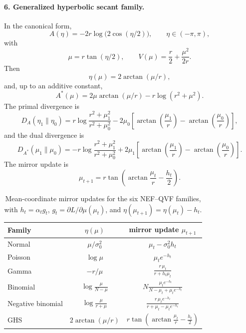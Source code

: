\documentclass[11pt]{article}
\begin{document}
\paragraph{6. Generalized hyperbolic secant family.}
In the canonical form,
\[
A(\eta)=-2r\log\!\bigl(2\cos(\eta/2)\bigr),
\qquad
\eta\in(-\pi,\pi),
\]
with
\[
\mu=r\tan(\eta/2),
\qquad
V(\mu)=\frac{r}{2}+\frac{\mu^2}{2r}.
\]
Then
\[
\eta(\mu)=2\arctan(\mu/r),
\]
and, up to an additive constant,
\[
A^\ast(\mu)=2\mu\arctan(\mu/r)-r\log(r^2+\mu^2).
\]
The primal divergence is
\[
D_A(\eta_1\|\eta_0)
=
r\log\frac{r^2+\mu_1^2}{r^2+\mu_0^2}
-
2\mu_0\left[
\arctan\!\left(\frac{\mu_1}{r}\right)
-
\arctan\!\left(\frac{\mu_0}{r}\right)
\right],
\]
and the dual divergence is
\[
D_{A^\ast}(\mu_1\|\mu_0)
=
-r\log\frac{r^2+\mu_1^2}{r^2+\mu_0^2}
+
2\mu_1\left[
\arctan\!\left(\frac{\mu_1}{r}\right)
-
\arctan\!\left(\frac{\mu_0}{r}\right)
\right].
\]
The mirror update is
\[
\mu_{t+1}
=
r\tan\!\left(
\arctan\!\frac{\mu_t}{r}
-\frac{h_t}{2}
\right).
\]

\begin{table}[t]
\centering
\begin{tabular}{lcc}
\toprule
Family & \(\eta(\mu)\) & mirror update \(\mu_{t+1}\) \\
\midrule
Normal & \(\mu/\sigma_0^2\) &
\(\mu_t-\sigma_0^2 h_t\) \\[2mm]

Poisson & \(\log\mu\) &
\(\mu_t e^{-h_t}\) \\[2mm]

Gamma & \(-r/\mu\) &
\(\displaystyle \frac{r\,\mu_t}{r+h_t\mu_t}\) \\[3mm]

Binomial & \(\log\frac{\mu}{N-\mu}\) &
\(\displaystyle N\frac{\mu_t e^{-h_t}}{N-\mu_t+\mu_t e^{-h_t}}\) \\[3mm]

Negative binomial & \(\log\frac{\mu}{r+\mu}\) &
\(\displaystyle \frac{r\,\mu_t e^{-h_t}}{r+\mu_t-\mu_t e^{-h_t}}\) \\[3mm]

GHS & \(2\arctan(\mu/r)\) &
\(\displaystyle r\tan\!\left(\arctan\!\frac{\mu_t}{r}-\frac{h_t}{2}\right)\) \\
\bottomrule
\end{tabular}
\caption{Mean-coordinate mirror updates for the six NEF--QVF families, with \(h_t=\alpha_t g_t\), \(g_t=\partial L/\partial\mu(\mu_t)\), and \(\eta(\mu_{t+1})=\eta(\mu_t)-h_t\).}
\end{table}
\end{document}
